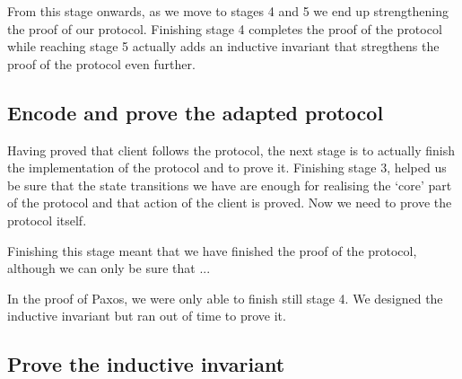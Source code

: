 From this stage onwards, as we move to stages 4 and 5 we end up strengthening
the proof of our protocol. Finishing stage 4 completes the proof of the protocol
while reaching stage 5 actually adds an inductive invariant that stregthens the
proof of the protocol even further.

\subsection{Encode and prove the adapted protocol}
Having proved that client follows the protocol, the next stage is
to actually finish the implementation of the protocol and to prove it. Finishing
stage 3, helped us be sure that the state transitions we have are enough for
realising the `core' part of the protocol and that action of the client is proved.
Now we need to prove the protocol itself.

Finishing this stage meant that we have finished the proof of the protocol,
although we can only be sure that ...

In the proof of Paxos, we were only able to finish still stage 4. We designed
the inductive invariant but ran out of time to prove it.

\subsection{Prove the inductive invariant}



